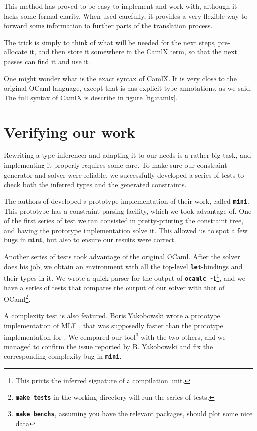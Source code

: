 \documentclass[10pt,a4paper,twoside,titlepage,twocolumn]{article}
\newcommand{\code}[1]{\textbf{\texttt{#1}}}
\begin{document}
This method has proved to be easy to implement and work with, although it lacks
some formal clarity. When used carefully, it provides a very flexible way to
forward some information to further parts of the translation process.

The trick is simply to think of what will be needed for the next steps,
pre-allocate it, and then store it somewhere in the CamlX term, so
that the next passes can find it and use it.

One might wonder what is the exact syntax of CamlX. It is very close to the
original OCaml language, except that is has explicit type annotations, as we
said. The full syntax of CamlX is describe in figure \vref{fig:camlx}.


\section{Verifying our work}

Rewriting a type-inferencer and adapting it to our needs is a rather big task, and
implementing it properly requires some care. To make sure our constraint
generator and solver were reliable, we successfully developed a series of tests
to check both the inferred types and the generated constraints.

The authors of \cite{pottier2005essence} developed a prototype implementation of
their work, called \code{mini}. This prototype has a constraint parsing
facility, which we took advantage of. One of the first series of test we ran
consisted in pretty-printing the constraint tree, and having the prototype
implementation solve it. This allowed us to spot a few bugs in \code{mini}, but
also to ensure our results were correct.

Another series of tests took advantage of the original OCaml. After the solver
does his job, we obtain an environment with all the top-level
\code{let}-bindings and their types in it. We wrote a quick parser for the
output of \code{ocamlc -i}\footnote{This prints the inferred signature of a
compilation unit.}, and we have a series of tests that compares the output of
our solver with that of OCaml\footnote{\code{make tests} in the working
directory will run the series of tests.}.

A complexity test is also featured. Boris Yakobowski wrote a prototype
implementation of MLF \cite{boris2008}, that was supposedly faster than the
prototype implementation for \cite{pottier2005essence}. We compared our
tool\footnote{\code{make benchs}, assuming you have the relevant packages,
should plot some nice data} with the two others, and we managed to confirm the
issue reported by B. Yakobowski and fix the corresponding complexity bug in
\code{mini}.
\end{document}
